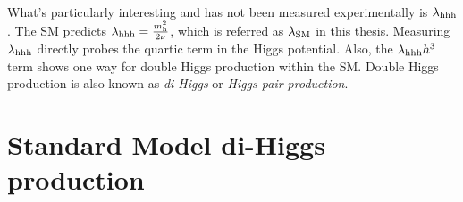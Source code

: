 \paragraph{}
What's particularly interesting and has not been measured experimentally is $\lambda_{\rm hhh}$. 
The SM predicts $\lambda_{\rm hhh} = \frac{m_{\rm h}^2}{2\rm\nu}$, which is referred as \textbf{$\lambda_{\rm SM}$} in this thesis. 
Measuring $\lambda_{\rm hhh}$ directly probes the quartic term in the Higgs potential.
Also, the $\lambda_{\rm hhh}h^3$ term shows one way for double Higgs production within the SM. Double Higgs production is also known as \textit{di-Higgs} or \textit{Higgs pair production}.



\section{Standard Model di-Higgs production}



